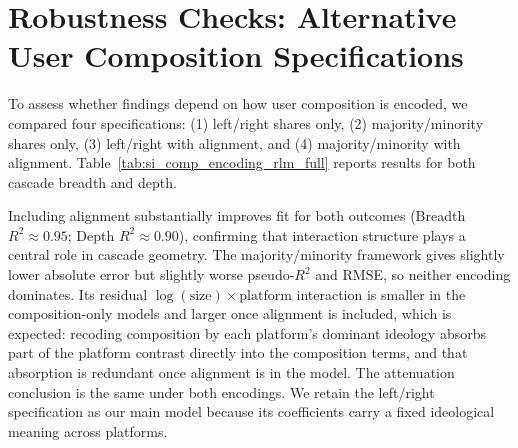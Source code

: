 \documentclass[letterpaper]{article} %
\newcommand{\rev}[1]{{\color{blue}#1}}
\begin{document}
\section{Robustness Checks: Alternative User Composition Specifications}
\label{app:robustcheck}
To assess whether findings depend on how user composition is encoded, we compared four specifications: (1) left/right shares only, (2) majority/minority shares only, (3) left/right with alignment, and (4) majority/minority with alignment. Table~\ref{tab:si_comp_encoding_rlm_full} reports results for both cascade breadth and depth.

Including alignment substantially improves fit for both outcomes (Breadth $R^2 \approx 0.95$; Depth $R^2 \approx 0.90$), confirming that interaction structure plays a central role in cascade geometry. \rev{The majority/minority framework gives slightly lower absolute error but slightly worse pseudo-$R^2$ and RMSE, so neither encoding dominates. Its residual $\log(\text{size}) \times \text{platform}$ interaction is smaller in the composition-only models and larger once alignment is included, which is expected: recoding composition by each platform's dominant ideology absorbs part of the platform contrast directly into the composition terms, and that absorption is redundant once alignment is in the model. The attenuation conclusion is the same under both encodings. We retain the left/right specification as our main model because its coefficients carry a fixed ideological meaning across platforms.}
\end{document}
